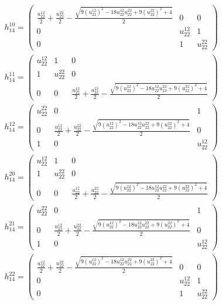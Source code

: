 \documentclass[a4paper, 11pt, twoside, onecolumn]{article}
\begin{document}
\begin{landscape}
\begin{gather*}
	 h_14^{10}=\begin{pmatrix}\frac{u^{12}_{22}}{2} + \frac{u^{22}_{22}}{2} - \frac{\sqrt{9 \left(u^{12}_{22}\right)^{2} - 18 u^{12}_{22} u^{22}_{22} + 9 \left(u^{22}_{22}\right)^{2} + 4}}{2} & 0 & 0\\0 & u^{12}_{22} & 1\\0 & 1 & u^{22}_{22}\end{pmatrix}\\ 
	 h_14^{11}=\begin{pmatrix}u^{12}_{22} & 1 & 0\\1 & u^{22}_{22} & 0\\0 & 0 & \frac{u^{12}_{22}}{2} + \frac{u^{22}_{22}}{2} - \frac{\sqrt{9 \left(u^{12}_{22}\right)^{2} - 18 u^{12}_{22} u^{22}_{22} + 9 \left(u^{22}_{22}\right)^{2} + 4}}{2}\end{pmatrix}\\ 
	 h_14^{12}=\begin{pmatrix}u^{22}_{22} & 0 & 1\\0 & \frac{u^{12}_{22}}{2} + \frac{u^{22}_{22}}{2} - \frac{\sqrt{9 \left(u^{12}_{22}\right)^{2} - 18 u^{12}_{22} u^{22}_{22} + 9 \left(u^{22}_{22}\right)^{2} + 4}}{2} & 0\\1 & 0 & u^{12}_{22}\end{pmatrix}\\ 
	 h_14^{20}=\begin{pmatrix}u^{12}_{22} & 1 & 0\\1 & u^{22}_{22} & 0\\0 & 0 & \frac{u^{12}_{22}}{2} + \frac{u^{22}_{22}}{2} - \frac{\sqrt{9 \left(u^{12}_{22}\right)^{2} - 18 u^{12}_{22} u^{22}_{22} + 9 \left(u^{22}_{22}\right)^{2} + 4}}{2}\end{pmatrix}\\ 
	 h_14^{21}=\begin{pmatrix}u^{22}_{22} & 0 & 1\\0 & \frac{u^{12}_{22}}{2} + \frac{u^{22}_{22}}{2} - \frac{\sqrt{9 \left(u^{12}_{22}\right)^{2} - 18 u^{12}_{22} u^{22}_{22} + 9 \left(u^{22}_{22}\right)^{2} + 4}}{2} & 0\\1 & 0 & u^{12}_{22}\end{pmatrix}\\ 
	 h_14^{22}=\begin{pmatrix}\frac{u^{12}_{22}}{2} + \frac{u^{22}_{22}}{2} - \frac{\sqrt{9 \left(u^{12}_{22}\right)^{2} - 18 u^{12}_{22} u^{22}_{22} + 9 \left(u^{22}_{22}\right)^{2} + 4}}{2} & 0 & 0\\0 & u^{12}_{22} & 1\\0 & 1 & u^{22}_{22}\end{pmatrix}\\ 
\end{gather*} 



\end{landscape}
\end{document}
